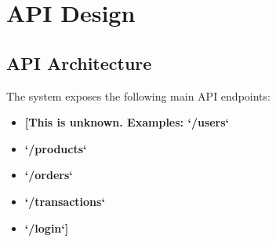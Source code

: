 \documentclass[11pt,a4paper,oneside]{article}
\begin{document}
\section{API Design}

\subsection{API Architecture}

The system exposes the following main API endpoints:
\begin{itemize}
\item \textbf{[This is unknown. Examples: `/users`}
\item \textbf{`/products`}
\item \textbf{`/orders`}
\item \textbf{`/transactions`}
\item \textbf{`/login`]}
\end{itemize}
\end{document}

